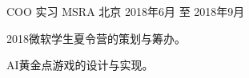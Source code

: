 

\begin{cventries}

  \cventry
    {COO 实习} %
    {MSRA} %
    {北京} %
    {2018年6月 至 2018年9月} %
    {
      \begin{cvitems} %
        \setlength\itemsep{1mm}
        \item {2018微软学生夏令营的策划与筹办。}
        \item {AI黄金点游戏的设计与实现。}
      \end{cvitems}
    }


\end{cventries}
